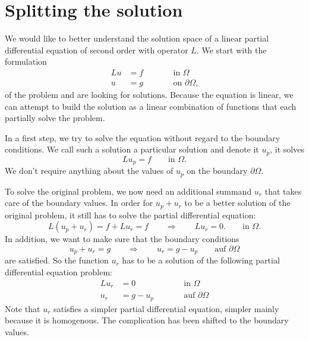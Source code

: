 %
%
%
\section{Splitting the solution}
We would like to better understand the solution space of a linear partial
differential equation of second order with operator $L$.
We start with the formulation
\begin{equation}
\begin{aligned}
Lu&=f&&\qquad\text{in $\Omega$}\\
 u&=g&&\qquad\text{on $\partial\Omega$,}
\end{aligned}
\label{pdgl2ord:allg}
\end{equation}
of the problem and are looking for solutions.
Because the equation is linear, we can attempt to build the solution
as a linear combination of functions that each partially solve the
problem.

In a first step, we try to solve the equation without regard to the
boundary conditions.
We call such a solution a particular solution and denote it $u_p$, it solves
\begin{equation}
Lu_p=f\qquad\text{in $\Omega$.}
\label{pdgl2ord:up}
\end{equation}
We don't require anything about the values of $u_p$ on the boundary
$\partial\Omega$.

To solve the original problem, we now need an additional summand $u_r$
that takes care of the boundary values.
In order for $u_p+u_r$ to be a better solution of the original problem,
it still has to solve the partial differential equation:
\[
L(u_p+u_r)=f+Lu_r=f\qquad\Rightarrow\qquad Lu_r=0.
\qquad\text{in $\Omega$.}
\]
In addition, we want to make sure that the boundary conditions
\[
u_p+u_r=g\qquad\Rightarrow\qquad u_r=g-u_p\qquad\text{auf $\partial\Omega$}
\]
are satisfied.
So the function $u_r$ has to be a solution of the following partial
differential equation problem:
\begin{equation}
\begin{aligned}
Lu_r&=0&&\qquad\text{in $\Omega$}\\
 u_r&=g-u_p&&\qquad\text{auf $\partial\Omega$}
\end{aligned}
\label{pdgl2ord:ur}
\end{equation}
Note that $u_r$ satisfies a simpler partial differential equation,
simpler mainly because it is homogenous.
The complication has been shifted to the boundary values.

